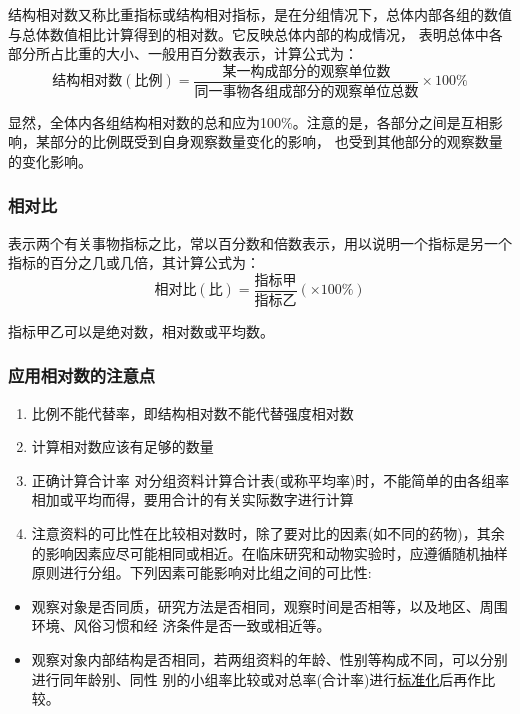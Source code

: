 \documentclass[
]{article}
\providecommand{\tightlist}{%
  \setlength{\itemsep}{0pt}\setlength{\parskip}{0pt}}
\begin{document}
结构相对数又称比重指标或结构相对指标，是在分组情况下，总体内部各组的数值与总体数值相比计算得到的相对数。它反映总体内部的构成情况，
表明总体中各部分所占比重的大小、一般用百分数表示，计算公式为：
\[结构相对数(比例)=\frac{某一构成部分的观察单位数}{同一事物各组成部分的观察单位总数}\times100\%\]

显然，全体内各组结构相对数的总和应为100\%。注意的是，各部分之间是互相影响，某部分的比例既受到自身观察数量变化的影响，
也受到其他部分的观察数量的变化影响。

\hypertarget{ux76f8ux5bf9ux6bd4}{%
\subsubsection{相对比}\label{ux76f8ux5bf9ux6bd4}}

表示两个有关事物指标之比，常以百分数和倍数表示，用以说明一个指标是另一个指标的百分之几或几倍，其计算公式为：
\[相对比(比)=\frac{指标甲}{指标乙}(\times100\%)\]

指标甲乙可以是绝对数，相对数或平均数。

\hypertarget{ux5e94ux7528ux76f8ux5bf9ux6570ux7684ux6ce8ux610fux70b9}{%
\subsubsection{应用相对数的注意点}\label{ux5e94ux7528ux76f8ux5bf9ux6570ux7684ux6ce8ux610fux70b9}}

\begin{enumerate}
\def\labelenumi{\arabic{enumi}.}
\tightlist
\item
  比例不能代替率，即结构相对数不能代替强度相对数
\item
  计算相对数应该有足够的数量
\item
  正确计算合计率 对分组资料计算合计表(或称平均率)时，不能简单的由各组率相加或平均而得，要用合计的有关实际数字进行计算
\item
  注意资料的可比性在比较相对数时，除了要对比的因素(如不同的药物)，其余的影响因素应尽可能相同或相近。在临床研究和动物实验时，应遵循随机抽样原则进行分组。下列因素可能影响对比组之间的可比性:
\end{enumerate}

\begin{itemize}
\item
  观察对象是否同质，研究方法是否相同，观察时间是否相等，以及地区、周围环境、风俗习惯和经 济条件是否一致或相近等。
\item
  观察对象内部结构是否相同，若两组资料的年龄、性别等构成不同，可以分别进行同年龄别、同性 别的小组率比较或对总率(合计率)进行\protect\hyperlink{ux7387ux7684ux6807ux51c6ux5316}{标准化}后再作比较。
\end{itemize}
\end{document}
